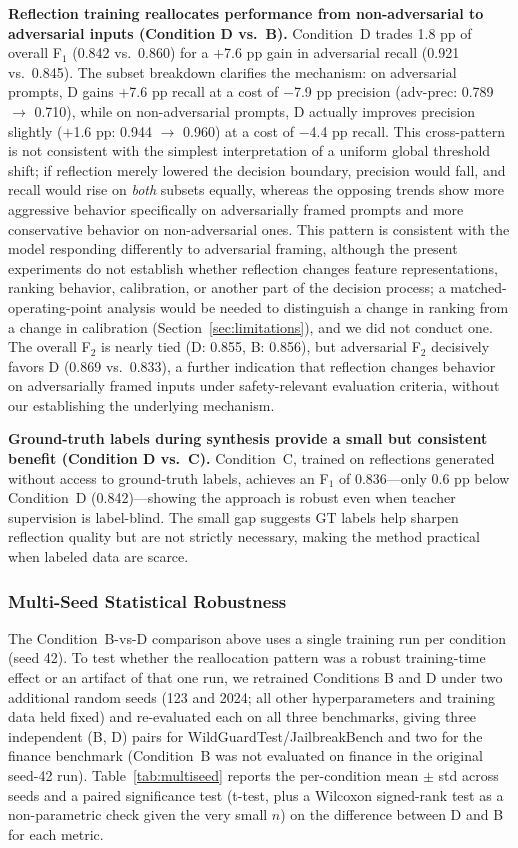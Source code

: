 \documentclass[superintelligence,article,accept,moreauthors]{Definitions/mdpi}
\begin{document}
\textbf{Reflection training reallocates performance from non-adversarial to adversarial inputs (Condition D vs.\ B).}
Condition~D trades 1.8 pp of overall F$_1$ (0.842 vs.\ 0.860) for a +7.6 pp gain in adversarial recall (0.921 vs.\ 0.845). The subset breakdown clarifies the mechanism: on adversarial prompts, D gains +7.6 pp recall at a cost of $-$7.9 pp precision (adv-prec: 0.789 $\to$ 0.710), while on non-adversarial prompts, D actually improves precision slightly ($+$1.6 pp: 0.944 $\to$ 0.960) at a cost of $-$4.4 pp recall. This cross-pattern is not consistent with the simplest interpretation of a uniform global threshold shift; if reflection merely lowered the decision boundary, precision would fall, and recall would rise on \emph{both} subsets equally, whereas the opposing trends show more aggressive behavior specifically on adversarially framed prompts and more conservative behavior on non-adversarial ones. This pattern is consistent with the model responding differently to adversarial framing, although the present experiments do not establish whether reflection changes feature representations, ranking behavior, calibration, or another part of the decision process; a matched-operating-point analysis would be needed to distinguish a change in ranking from a change in calibration (Section~\ref{sec:limitations}), and we did not conduct one. The overall F$_2$ is nearly tied (D: 0.855, B: 0.856), but adversarial F$_2$ decisively favors D (0.869 vs.\ 0.833), a further indication that reflection changes behavior on adversarially framed inputs under safety-relevant evaluation criteria, without our establishing the underlying mechanism.

\textbf{Ground-truth labels during synthesis provide a small but consistent benefit (Condition D vs.\ C).}
Condition~C, trained on reflections generated without access to ground-truth labels, achieves an F$_1$ of 0.836---only 0.6 pp below Condition~D (0.842)---showing the approach is robust even when teacher supervision is label-blind. The small gap suggests GT labels help sharpen reflection quality but are not strictly necessary, making the method practical when labeled data are scarce.

\subsubsection{Multi-Seed Statistical Robustness}
\label{sec:multiseed}

The Condition~B-vs-D comparison above uses a single training run per condition (seed 42). To test whether the reallocation pattern was a robust training-time effect or an artifact of that one run, we retrained Conditions B and D under two additional random seeds (123 and 2024; all other hyperparameters and training data held fixed) and re-evaluated each on all three benchmarks, giving three independent (B, D) pairs for WildGuardTest/JailbreakBench and two for the finance benchmark (Condition~B was not evaluated on finance in the original seed-42 run). Table~\ref{tab:multiseed} reports the per-condition mean $\pm$ std across seeds and a paired significance test (t-test, plus a Wilcoxon signed-rank test as a non-parametric check given the very small $n$) on the difference between D and B for each metric.
\end{document}
